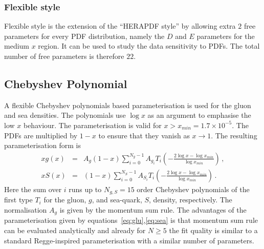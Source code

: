 \subsubsection{Flexible style}
Flexible style is the extension of the ``HERAPDF style'' by allowing  extra $2$ free parameters for every PDF distribution, namely the $D$ and $E$ parameters for the medium $x$ region. It can be used to study the data sensitivity to PDFs. The total number of free parameters is therefore $22$.


\subsection{Chebyshev Polynomial}

A flexible Chebyshev polynomials based parameterisation is used for the gluon and sea densities. The polynomials
use $\log x$ as an argument to emphasise the low $x$ behaviour. 
The parameterisation is valid for $x>x_{min} = 1.7\times 10^{-5}$. The PDFs are multiplied
by $1-x$ to ensure that they vanish as $x\to 1$. The resulting parameterisation form is 
\begin{eqnarray}
x g(x) &=& A_g \left(1-x\right) \sum_{i=0}^{N_g-1} A_{g_i} T_i \left(-\frac{\textstyle 2\log x - \log x_{min} } {\textstyle \log x_{min} } \right)\,, \label{eq:glu} \\
x S(x) &=& \left(1-x\right) \sum_{i=0}^{N_S-1} A_{S_i} T_i \left(-\frac{\textstyle 2\log x - \log x_{min} } {\textstyle \log x_{min} } \right)\,. \label{eq:sea} 
\end{eqnarray}
Here the sum over $i$ runs up to $N_{g,S}=15$ order Chebyshev polynomials of the first type $T_i$ for
the gluon, $g$, and sea-quark, $S$, density, respectively. 
The normalisation $A_g$ is given by the momentum sum rule.
The advantages of the parameterisation given by equations~\ref{eq:glu},\ref{eq:sea} is that momentum
sum rule can be evaluated analytically and  already for $N \ge 5$ the fit quality
is similar to a standard Regge-inspired parameterisation with a similar number of parameters.



